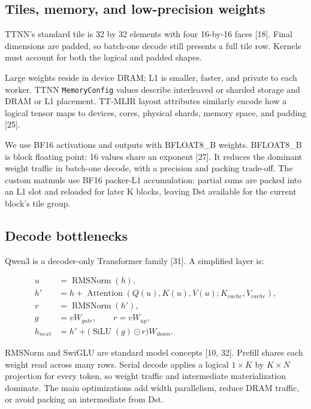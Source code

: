 \documentclass[
  10pt,
  american,
  10pt,
  letterpaper]{article}
\begin{document}
\hypertarget{tiles-memory-and-low-precision-weights}{%
\subsection{Tiles, memory, and low-precision
weights}\label{tiles-memory-and-low-precision-weights}}

TTNN's standard tile is 32 by 32 elements with four 16-by-16 faces
{[}18{]}. Final dimensions are padded, so batch-one decode still
presents a full tile row. Kernels must account for both the logical and
padded shapes.

Large weights reside in device DRAM; L1 is smaller, faster, and private
to each worker. TTNN \texttt{MemoryConfig} values describe interleaved
or sharded storage and DRAM or L1 placement. TT-MLIR layout attributes
similarly encode how a logical tensor maps to devices, cores, physical
shards, memory space, and padding {[}25{]}.

We use BF16 activations and outputs with BFLOAT8\_B weights. BFLOAT8\_B
is block floating point: 16 values share an exponent {[}27{]}. It
reduces the dominant weight traffic in batch-one decode, with a
precision and packing trade-off. The custom matmuls use BF16 packer-L1
accumulation: partial sums are packed into an L1 slot and reloaded for
later K blocks, leaving Dst available for the current block's tile
group.

\hypertarget{decode-bottlenecks}{%
\subsection{Decode bottlenecks}\label{decode-bottlenecks}}

Qwen3 is a decoder-only Transformer family {[}31{]}. A simplified layer
is:

\[
\begin{aligned}
u &= \operatorname{RMSNorm}(h),\\
h' &= h + \operatorname{Attention}(Q(u),K(u),V(u);K_{cache},V_{cache}),\\
v &= \operatorname{RMSNorm}(h'),\\
g &= vW_{gate}, \qquad r = vW_{up},\\
h_{next} &= h' + \bigl(\operatorname{SiLU}(g)\odot r\bigr)W_{down}.
\end{aligned}
\]

RMSNorm and SwiGLU are standard model concepts {[}10, 32{]}. Prefill
shares each weight read across many rows. Serial decode applies a
logical \(1\times K\) by \(K\times N\) projection for every token, so
weight traffic and intermediate materialization dominate. The main
optimizations add width parallelism, reduce DRAM traffic, or avoid
packing an intermediate from Dst.
\end{document}
